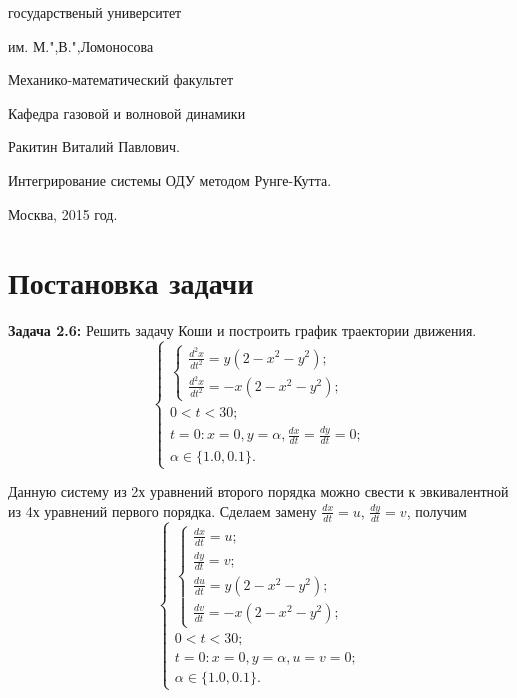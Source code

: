 \documentclass[a4paper,14pt]{article}
\begin{document}
\begin{titlepage}
\thispagestyle{empty}
\setcounter{page}{0}
\begin{center}{
 государственый университет 

им. М.",В.",Ломоносова

Механико-математический факультет

Кафедра газовой и волновой динамики}
\end{center}
\vspace{120pt}
\begin{center}
\Large Ракитин Виталий Павлович.
\end{center}
\vspace{20pt}
\begin{center}{\LARGE Интегрирование системы ОДУ методом Рунге-Кутта.}
\end{center}

\vspace{80pt}

\vfill
\begin{center}
Москва, 2015 год.
\end{center}
\end{titlepage}

\tableofcontents
\newpage

\section{Постановка задачи}

{\bf Задача 2.6: } Решить задачу Коши и построить график траектории движения.
\[
\begin{cases}
	\begin{cases}
	\frac{d^2 x}{dt^2} = y(2 - x^2 - y^2); \\
	\frac{d^2 x}{dt^2} = -x(2 - x^2 - y^2);
    \end{cases}\\
	0 < t < 30; \\
	t = 0: x = 0, y =\alpha, \frac{d x}{dt} =\frac{d y}{dt} = 0;\\
	\alpha \in \{1.0, 0.1\}.
\end{cases}
\]

Данную систему из 2х уравнений второго порядка можно свести к эвкивалентной из 4х уравнений первого порядка. Сделаем замену $\frac{dx}{dt} = u$, $\frac{dy}{dt} = v$, получим
\[
\begin{cases}
	\begin{cases}
	\frac{d x}{d t} = u;\\
	\frac{d y}{d t} = v;\\
	\frac{d u}{d t} = y(2 - x^2 - y^2); \\
	\frac{d v}{d t} = -x(2 - x^2 - y^2);
    \end{cases}\\
	0 < t < 30; \\
	t = 0: x = 0, y =\alpha, u = v = 0;\\
	\alpha \in \{1.0, 0.1\}.
\end{cases}
\]
\end{document}
